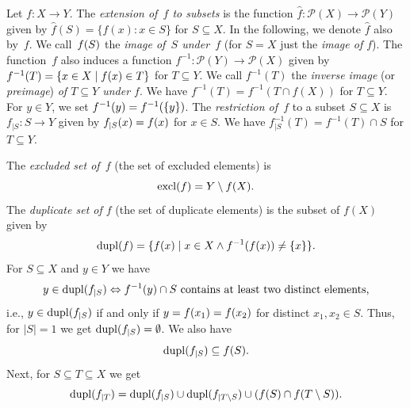 \label{def:preimage}
\label{def:f_set_ext} 
Let $f \colon X \to Y$.
The \emph{extension of~$f$ to subsets}
is the function $\hat{f} \colon \mathcal P(X) \to \mathcal P(Y)$ given
by $\hat{f}(S) = \{ f(x) : x \in S \}$ for $S \subseteq X$.
In the following, we denote $\hat{f}$ also by~$f$. 
We call~$\applyfunc{S}{f}$ the \emph{image of~$S$ under~$f$} (for $S = X$ just the \emph{image of $f$}).
The function~$f$ also induces a function $f^{-1} \colon \mathcal P(Y) \to \mathcal P(X)$ given by
$f^{-1}(T) = \{ x \in X \mid \applyfunc{x}{f} \in T \}$ for $T \subseteq Y$. We call $f^{-1}(T)$
the \emph{inverse image} (or \emph{preimage}) \emph{of $T \subseteq Y$ under $f$}.
We have $f^{-1}(T) = f^{-1}(T \cap f(X))$ for $T \subseteq Y$.
For $y \in Y$, we set $\applyfunc{y}{f^{-1}} = \applyfunc{\{y\}}{f^{-1}}$.
The \emph{restriction of~$f$} 
to a subset $S \subseteq X$
is $f_{\vert {S}} \colon S \to Y$
given by $f_{\vert S}(x) = \applyfunc{x}{f}$ for $x \in S$.
We have $f_{\vert S}^{-1}(T) = f^{-1}(T) \cap S$ for $T \subseteq Y$.

\label{def:dupl_t} 
\label{def:excl_t}

The \emph{excluded set of~$f$} (the set of excluded elements)
is 
\[ \excl{f} = Y \setminus \applyfunc{X}{f}.
\] 
The \emph{duplicate set of $f$} (the set of duplicate elements)
is the subset of $f(X)$ given by
\[ 
\dupl{f} = \{ f(x) \mid x \in X \land f^{-1}(f(x)) \ne \{x\} \}.
\] 
For $S \subseteq X$ and $y \in Y$ we have
\begin{equation}\label{prelim:eqn:dupl-restrict}
	y \in \dupl{f_{|S}} \Leftrightarrow f^{-1}(y) \cap S \text{ contains at least two distinct elements,}
\end{equation}
i.e., $y \in \dupl{f_{|S}}$ if and only if $y = \applyfunc{x_1}{f} = \applyfunc{x_2}{f}$
for distinct $x_1, x_2 \in S$.
Thus, for $|S| = 1$ we get $\dupl{f_{|S}} = \emptyset$.
We also have 
\begin{equation} \label{prelim:eqn:duplfS-in-image}
	\dupl{f_{|S}} \subseteq f(S).
\end{equation}
Next, for $S \subseteq T \subseteq X$ we get
\begin{equation} \label{prelim:func:eqn:duplicate-partition}
	\dupl{f_{|T}} = \dupl{f_{|S}} \cup \dupl{f_{|T \setminus S}} \cup ( f(S) \cap f(T \setminus S) ).
\end{equation}

